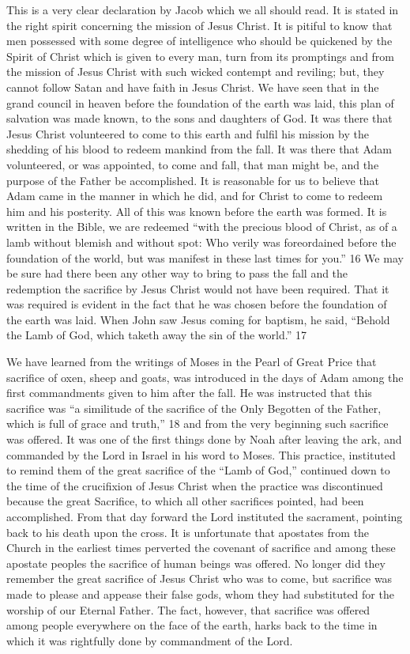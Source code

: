 This is a very clear declaration by Jacob which we all should read. It is stated in the right
spirit concerning the mission of Jesus Christ. It is pitiful to know that men possessed with
some degree of intelligence who should be quickened by the Spirit of Christ which is given
to every man, turn from its promptings and from the mission of Jesus Christ with such
wicked contempt and reviling; but, they cannot follow Satan and have faith in Jesus Christ.
We have seen that in the grand council in heaven before the foundation of the earth was laid,
this plan of salvation was made known, to the sons and daughters of God. It was there that
Jesus Christ volunteered to come to this earth and fulfil his mission by the shedding of his
blood to redeem mankind from the fall. It was there that Adam volunteered, or was
appointed, to come and fall, that man might be, and the purpose of the Father be
accomplished. It is reasonable for us to believe that Adam came in the manner in which he
did, and for Christ to come to redeem him and his posterity. All of this was known before the
earth was formed. It is written in the Bible, we are redeemed ``with the precious blood of
Christ, as of a lamb without blemish and without spot: Who verily was foreordained before
the foundation of the world, but was manifest in these last times for you.'' 16 We may be sure
had there been any other way to bring to pass the fall and the redemption the sacrifice by
Jesus Christ would not have been required. That it was required is evident in the fact that he
was chosen before the foundation of the earth was laid. When John saw Jesus coming for
baptism, he said, ``Behold the Lamb of God, which taketh away the sin of the world.'' 17

We have learned from the writings of Moses in the Pearl of Great Price that sacrifice of oxen,
sheep and goats, was introduced in the days of Adam among the first commandments given
to him after the fall. He was instructed that this sacrifice was ``a similitude of the sacrifice of
the Only Begotten of the Father, which is full of grace and truth,'' 18 and from the very
beginning such sacrifice was offered. It was one of the first things done by Noah after
leaving the ark, and commanded by the Lord in Israel in his word to Moses. This practice,
instituted to remind them of the great sacrifice of the ``Lamb of God,'' continued down to the
time of the crucifixion of Jesus Christ when the practice was discontinued because the great
Sacrifice, to which all other sacrifices pointed, had been accomplished. From that day
forward the Lord instituted the sacrament, pointing back to his death upon the cross. It is
unfortunate that apostates from the Church in the earliest times perverted the covenant of
sacrifice and among these apostate peoples the sacrifice of human beings was offered. No
longer did they remember the great sacrifice of Jesus Christ who was to come, but sacrifice
was made to please and appease their false gods, whom they had substituted for the worship
of our Eternal Father. The fact, however, that sacrifice was offered among people everywhere
on the face of the earth, harks back to the time in which it was rightfully done by
commandment of the Lord.

